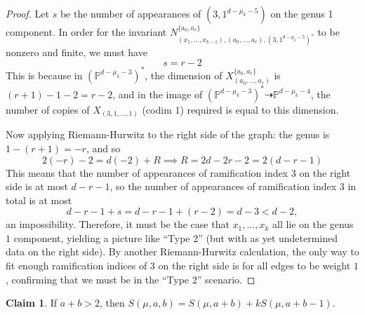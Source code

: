\documentclass[11pt]{article}           %
\renewcommand{\P}{\mathbb P}
\theoremstyle{definition}
\newtheorem*{claim}{Claim}
\theoremstyle{definition}
\begin{document}
\begin{proof}
\begin{tikzpicture}
\end{tikzpicture}

Let $s$ be the number of appearances of $(3,1^{d-\mu_k-5})$ on the genus 1 component. In order
for the invariant $N_{(x_1,\dots,x_{k-1}),(a_0,\dots,a_r),(3,1^{d-\mu_k-5})^s}^{\{a_0,a_r\}}$ to be nonzero and finite, we must have
\[
s=r-2
\]
This is because in $(\P^{d-\mu_k-3})^*$, the dimension of $X_{(a_0,\dots,a_r)}^{\{a_0,a_r\}}$ is
$(r+1)-1-2=r-2$, and in the image of $(\P^{d-\mu_k-3})^*\dashrightarrow \P^{d-\mu_k-4}$, the number
of copies of $X_{(3,1,\dots,1)}$ (codim 1) required is equal to this dimension.

Now applying Riemann-Hurwitz to the right side of the graph: the genus is $1-(r+1)=-r$, and
so
\[
2(-r)-2=d(-2)+R\implies R=2d-2r-2=2(d-r-1)
\]
This means that the number of appearances of ramification index $3$ on the right side is at
most $d-r-1$, so the number of appearances of ramification index $3$ in total is at most
\[
d-r-1+s=d-r-1+(r-2)=d-3<d-2,
\]
an impossibility. Therefore, it must be the case that $x_1,\dots,x_k$ all lie on the genus
$1$ component, yielding a picture like ``Type 2'' (but with as yet undetermined data on the right side). By another Riemann-Hurwitz calculation, the only way to fit enough ramification indices of $3$
on the right side is for all edges to be weight $1$, confirming that we must be in the ``Type 2'' scenario.
  
\end{proof}

\begin{claim} If $a+b>2$, then $S(\mu,a,b)=S(\mu,a+b)+kS(\mu,a+b-1)$.
\end{claim}
\end{document}
